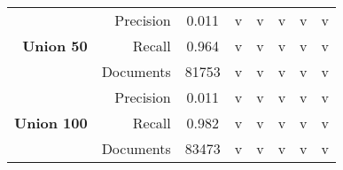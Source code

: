 \begin{table}[h!]
\begin{tabular}{rrcccccc}
        \multirow{3}{*}{\textbf{Union 50}} & Precision & 0.011 & v & v & v & v & v \\
                                           & Recall    & 0.964 & v & v & v & v & v \\
                                           & Documents & 81753 & v & v & v & v & v \\
        \midrule

        \multirow{3}{*}{\textbf{Union 100}} & Precision & 0.011 & v & v & v & v & v \\
                                            & Recall    & 0.982 & v & v & v & v & v \\
                                            & Documents & 83473 & v & v & v & v & v \\

        \bottomrule 
    \end{tabular}
\end{table}

